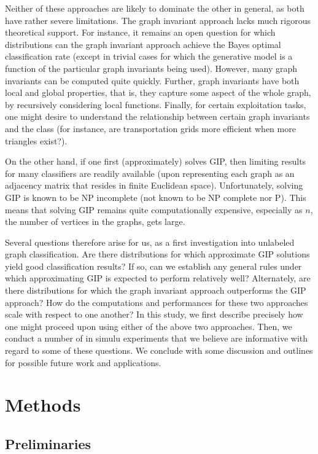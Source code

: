 Neither of these approaches are likely to dominate the other in general, as both have rather severe limitations.  The graph invariant approach lacks much rigorous theoretical support.  For instance, it remains an open question for which distributions can the graph invariant approach achieve the Bayes optimal classification rate (except in trivial cases for which the generative model is a function of the particular graph invariants being used). However, many graph invariants can be computed quite quickly.  Further, graph invariants have both local and global properties, that is, they capture some aspect of the whole graph, by recursively considering local functions.  Finally, for certain exploitation tasks, one might desire to understand the relationship between certain graph invariants and the class (for instance, are transportation grids more efficient when more triangles exist?).  

On the other hand, if one first (approximately) solves GIP, then limiting results for many classifiers are readily available (upon representing each graph as an adjacency matrix that resides in finite  Euclidean space).  Unfortunately, solving GIP is known to be NP incomplete \cite{??} (not known to be NP complete nor P).   This means that solving GIP remains quite computationally expensive, especially as $n$, the number of vertices in the graphs, gets large.

Several questions therefore arise for us, as a first investigation into unlabeled graph classification.  Are there distributions for which approximate GIP solutions yield good classification results? If so, can we establish any general rules under which approximating GIP is expected to perform relatively well?  Alternately, are there distributions for which the graph invariant approach outperforms the GIP approach?  How do the computations and performances for these two approaches scale with respect to one another?  In this study, we first describe precisely how one might proceed upon using either of the above two approaches.  Then, we conduct a number of in simulu experiments that we believe are informative with regard to some of these questions.  We conclude with some discussion and outlines for possible future work and applications.

\section{Methods} %
\label{sec:methods}

\subsection{Preliminaries} %
\label{sub:nomenclature}

